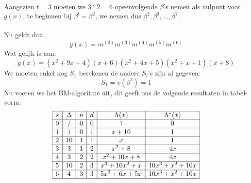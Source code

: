 \documentclass[11pt,a4paper,titlepage]{article}
\begin{document}
\begin{enumerate}[label=(\alph*)]
\noindent \\Aangezien $t = 3$ moeten we $3*2 = 6$ opeenvolgende $\beta$'s nemen als nulpunt voor $g(x)$, te beginnen bij $\beta ^l = \beta ^2$, we nemen dus $\beta ^2, \beta ^3, \dots, \beta ^7$. \\ \\
Nu geldt dat:
	$$g(x) = m^{(2)}m^{(3)}m^{(4)}m^{(5)}m^{(6)}$$
Wat gelijk is aan:
	$$g(x) = (x^2 +9 x + 4)(x + 6)(x^2 + 4x + 5)(x^2 +x + 1)(x+8)$$
We moeten enkel nog $S_1$ berekenen de andere $S_i$'s zijn al gegeven:
	$$S_1 = v(\beta ^2) = 1$$
Nu voeren we het BM-algoritme uit, dit geeft ons de volgende resultaten in tabel-vorm:
	$$\begin{array}{| c | c | c | c | c | c |}
	\hline
	s	& \Delta	& n		& d		& \Lambda(x)	& \Lambda^{*}(x) \\
	\hline
	0	& /			& 0		& 0		& 1				& 0 \\ \hline
	1	& 1			& 0		& 1		& x	+10			& 1 \\ \hline
	2	& 10			& 1		& 1		& x				& 1 \\ \hline
	3	& 3			& 1		& 2		& x^2 + 8			& 4x \\ \hline
	4	& 3			& 2		& 2		&  x^2 + 10 x + 8	& 4x \\ \hline
	5	& 10			& 2		& 3		&  x^3 + 10 x^2 + x	& 10x^3 + x^2+10x \\ \hline
	6	& 4			& 3		& 3		& 5x^3 + 6x +5x	& 10x^3 + x^2+10x \\
	\hline
\end{array}$$
\end{enumerate}
\end{document}
